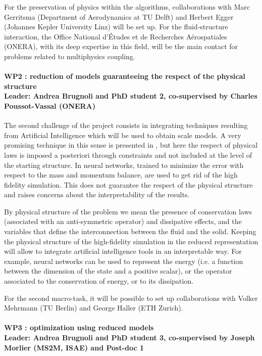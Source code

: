 \documentclass[12pt]{article}
\begin{document}
		For the preservation of physics within the algorithms, collaborations with Marc Gerritsma (Department of Aerodynamics at TU Delft) and Herbert Egger (Johannes Kepler University Linz) will be set up. For the fluid-structure interaction, the Office National d'Études et de Recherches Aérospatiales (ONERA), with its deep expertise in this field, will be the main contact for problems related to multiphysics coupling.
	
	\paragraph{\large WP2 : reduction of models guaranteeing the respect of the physical structure\\
		Leader: Andrea Brugnoli and PhD student 2, co-supervised by Charles Poussot-Vassal (ONERA)\\}
		
		The second challenge of the project consists in integrating techniques resulting from Artificial Intelligence
		which will be used to obtain scale models. A very promising technique in this sense is presented in \cite{lee2020}, but here the respect of physical laws is imposed a posteriori through constraints and not included at the level of the starting structure. In \cite{sun2020physics} neural networks, trained to minimize the error with respect to the mass and momentum balance, are used to get rid of the high fidelity simulation. This does not guarantee the respect of the physical structure and raises concerns about the interpretability of the results.
		
		By physical structure of the problem we mean the presence of conservation laws (associated with an anti-symmetric operator) and dissipative effects, and the variables that define the interconnection between the fluid and the solid. Keeping the physical structure of the high-fidelity simulation in the reduced representation will allow to integrate artificial intelligence tools in an interpretable way. For example, neural networks can be used to represent the energy (i.e. a function between the dimension of the state and a positive scalar), or the operator associated to the conservation of energy, or to its dissipation. 
		
		For the second macro-task, it will be possible to set up collaborations with Volker Mehrmann (TU Berlin) and George Haller (ETH Zurich).
		
	
	\paragraph{\large WP3 : optimization using reduced models\\
		Leader: Andrea Brugnoli and PhD student 3, co-supervised by Joseph Morlier (MS2M, ISAE) and Post-doc 1\\}
	
\end{document}
